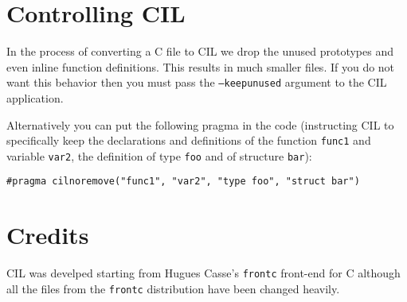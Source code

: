 \documentclass{article}
\newcommand{\t}[1]{{\tt #1}}
\begin{document}
\section{Controlling CIL}

 In the process of converting a C file to CIL we drop the unused prototypes
and even inline function definitions. This results in much smaller files. If
you do not want this behavior then you must pass the \t{--keepunused} argument
to the CIL application. 

 Alternatively you can put the following pragma in the code (instructing CIL
to specifically keep the declarations and definitions of the function
\t{func1} and variable \t{var2}, the definition of type \t{foo} and of
structure \t{bar}):
\begin{verbatim}
#pragma cilnoremove("func1", "var2", "type foo", "struct bar")
\end{verbatim}


\section{Credits}

 CIL was develped starting from Hugues Casse's \t{frontc} front-end for C
although all the files from the \t{frontc} distribution have been changed
heavily. 
 
\end{document}
